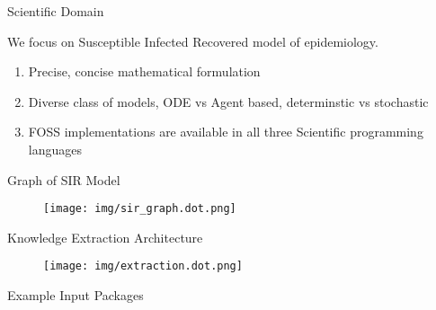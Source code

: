 \documentclass[ignorenonframetext,]{beamer}
\providecommand{\tightlist}{%
  \setlength{\itemsep}{0pt}\setlength{\parskip}{0pt}}
\begin{document}
\begin{frame}{Scientific Domain}
\protect\hypertarget{scientific-domain}{}

We focus on Susceptible Infected Recovered model of epidemiology.

\begin{enumerate}
\tightlist
\item
  Precise, concise mathematical formulation
\item
  Diverse class of models, ODE vs Agent based, determinstic vs
  stochastic
\item
  FOSS implementations are available in all three Scientific programming
  languages
\end{enumerate}

\end{frame}

\begin{frame}{Graph of SIR Model}
\protect\hypertarget{graph-of-sir-model}{}

\begin{figure}
\centering
\texttt{[image: img/sir\_graph.dot.png]}
\end{figure}

\end{frame}

\begin{frame}{Knowledge Extraction Architecture}
\protect\hypertarget{knowledge-extraction-architecture}{}

\begin{figure}
\centering
\texttt{[image: img/extraction.dot.png]}
\end{figure}

\end{frame}

\begin{frame}{Example Input Packages}
\protect\hypertarget{example-input-packages}{}


\end{frame}
\end{document}
